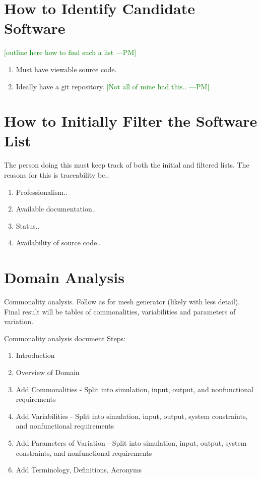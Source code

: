 \documentclass[letterpaper,cleveref]{lipics-v2019}
\newcommand{\authornote}[3]{\textcolor{#1}{[#3 ---#2]}}
\newcommand{\authornote}[3]{}
\newcommand{\pmi}[1]{\authornote{green}{PM}{#1}} %
\theoremstyle{definition}
\begin{document}
\section{How to Identify Candidate Software} \label{SecIdentifyCandSoft}
\pmi{outline here how to find such a list}
\begin{enumerate}
\item Must have viewable source code.
\item Ideally have a git repository. \pmi{Not all of mine had this..}
\end{enumerate}

\section{How to Initially Filter the Software List} \label{SecInitialFilter}
The person doing this must keep track of both the initial and filtered lists. The reasons for this is traceability bc..
\begin{enumerate}
	\item Professionalism..
	\item Available documentation..
	\item Status..
	\item Availability of source code..
\end{enumerate}

\section{Domain Analysis} \label{SecDomainAnalysis}

Commonality analysis.  Follow as for mesh generator (likely with less detail).
Final result will be tables of commonalities, variabilities and parameters of
variation.

Commonality analysis document Steps:
\begin{enumerate}
\item Introduction
\item Overview of Domain
\item Add Commonalities - Split into simulation, input, output, and
  nonfunctional requirements
\item Add Variabilities - Split into simulation, input, output, system
  constraints, and nonfunctional requirements
\item Add Parameters of Variation - Split into simulation, input, output, system
  constraints, and nonfunctional requirements
\item Add Terminology, Definitions, Acronyms
\end{enumerate}
\end{document}
